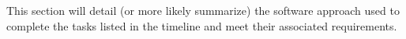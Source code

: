 This section will detail (or more likely summarize) the software approach used to complete the tasks listed in the timeline and meet their associated requirements.